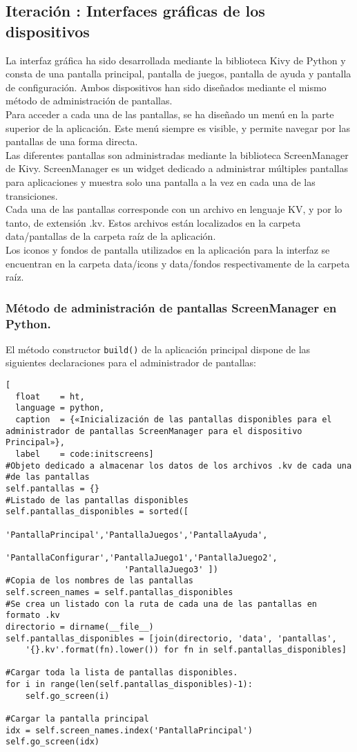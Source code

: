 \subsection{Iteración : Interfaces gráficas de los dispositivos}

La interfaz gráfica ha sido desarrollada mediante la biblioteca Kivy de Python y consta de una pantalla principal, pantalla de juegos, pantalla de ayuda y pantalla de configuración. Ambos dispositivos han sido diseñados mediante el mismo método de administración de pantallas.\\
Para acceder a cada una de las pantallas, se ha diseñado un menú en la parte superior de la aplicación. Este menú siempre es visible, y permite navegar por las pantallas de una forma directa.\\
Las diferentes pantallas son administradas mediante la biblioteca ScreenManager de Kivy.
ScreenManager es un widget dedicado a administrar múltiples pantallas para aplicaciones y muestra solo una pantalla a la vez en cada una de las transiciones.\\
Cada una de las pantallas corresponde con un archivo en lenguaje KV, y por lo tanto, de extensión .kv. Estos archivos están localizados en la carpeta data/pantallas de la carpeta raíz de la aplicación.\\
Los iconos y fondos de pantalla utilizados en la aplicación para la interfaz se encuentran en la carpeta data/icons y data/fondos respectivamente de la carpeta raíz.\\

\subsubsection{Método de administración de pantallas ScreenManager en Python.}
El método constructor \texttt{build()} de la aplicación principal dispone de las siguientes declaraciones para el administrador de pantallas:
\begin{lstlisting}[
  float    = ht,  
  language = python,
  caption  = {«Inicialización de las pantallas disponibles para el administrador de pantallas ScreenManager para el dispositivo Principal»},
  label    = code:initscreens]
#Objeto dedicado a almacenar los datos de los archivos .kv de cada una
#de las pantallas
self.pantallas = {}
#Listado de las pantallas disponibles
self.pantallas_disponibles = sorted([
            			'PantallaPrincipal','PantallaJuegos','PantallaAyuda',
            			'PantallaConfigurar','PantallaJuego1','PantallaJuego2',
            			'PantallaJuego3' ])
#Copia de los nombres de las pantallas
self.screen_names = self.pantallas_disponibles
#Se crea un listado con la ruta de cada una de las pantallas en formato .kv
directorio = dirname(__file__)
self.pantallas_disponibles = [join(directorio, 'data', 'pantallas',
	'{}.kv'.format(fn).lower()) for fn in self.pantallas_disponibles]

#Cargar toda la lista de pantallas disponibles.
for i in range(len(self.pantallas_disponibles)-1):
	self.go_screen(i)

#Cargar la pantalla principal
idx = self.screen_names.index('PantallaPrincipal')
self.go_screen(idx)
\end{lstlisting}

